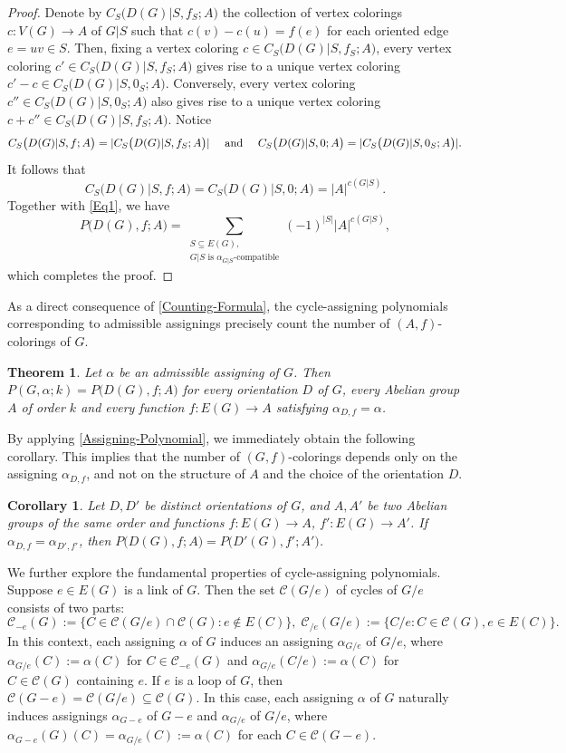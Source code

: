 \documentclass[12pt]{article}%
\numberwithin{equation}{section}
\def\And{\mbox{\rm ~and~}}
\newtheorem{theorem}{Theorem}[section]
\newtheorem{corollary}[corollary]{Corollary}
\begin{document}
\begin{proof}
Denote by  $C_S\big(D(G)|S,f_S;A\big)$ the collection of  vertex colorings $c:V(G)\to A$ of $G|S$ such that $c(v)-c(u)=f(e)$ for each oriented edge $e=uv\in S$. Then, fixing a vertex coloring $c\in C_S\big(D(G)|S,f_S;A\big)$, every vertex coloring $c'\in C_S\big(D(G)|S,f_S;A\big)$ gives rise to a unique vertex coloring $c'-c\in C_S\big(D(G)|S,0_S;A\big)$. Conversely, every vertex coloring $c''\in C_S\big(D(G)|S,0_S;A\big)$ also gives rise to a unique vertex coloring $c+c''\in C_S\big(D(G)|S,f_S;A\big)$. Notice
\[
C_S\big(D(G)|S,f;A\big)=|C_S\big(D(G)|S,f_S;A\big)|\quad\And\quad C_S\big(D(G)|S,0;A\big)=|C_S\big(D(G)|S,0_S;A\big)|.
\]
It follows that
\begin{equation*}
C_S\big(D(G)|S,f;A\big)=C_S\big(D(G)|S,0;A\big)=|A|^{c(G|S)}.
\end{equation*}
Together with \eqref{Eq1}, we have
\[
P\big(D(G),f;A\big)=\sum_{\substack{S\subseteq E(G),\\G|S\mbox{ is $\alpha_{G|S}$-compatible}}}(-1)^{|S|}|A|^{c(G|S)},
\]
which completes the proof.
\end{proof}
As a direct consequence of \autoref{Counting-Formula}, the cycle-assigning polynomials corresponding to admissible assignings precisely count the number of $(A,f)$-colorings of  $G$. 
\begin{theorem}\label{Assigning-Polynomial}
Let $\alpha$ be an admissible assigning of $G$. Then $P(G,\alpha;k)=P\big(D(G),f;A\big)$ for every orientation $D$ of $G$, every Abelian group $A$ of order $k$ and every function $f:E(G)\to A$ satisfying $\alpha_{D,f}=\alpha$.
\end{theorem}

By applying \autoref{Assigning-Polynomial}, we immediately obtain the following corollary. This implies that the number of $(G,f)$-colorings depends only on the assigning $\alpha_{D,f}$, and not on the structure of $A$ and the choice of the orientation $D$.
\begin{corollary}\label{A=B}
Let  $D,D'$ be distinct orientations of $G$, and $A,A'$ be two Abelian groups of the same order and functions $f:E(G)\to A$, $f':E(G)\to A'$. If $\alpha_{D,f}=\alpha_{D',f'}$, then $P\big(D(G),f;A\big)=P\big(D'(G),f';A'\big)$.
\end{corollary}

We further explore the fundamental properties of cycle-assigning polynomials. Suppose $e\in E(G)$ is a link of $G$. Then the set $\mathcal{C}(G/e)$ of cycles of $G/e$ consists of two parts: 
\[
\mathcal{C}_{-e}(G):=\big\{C\in\mathcal{C}(G/e)\cap\mathcal{C}(G):e\notin E(C)\big\},\;\mathcal{C}_{/e}(G/e):=\big\{C/e:C\in\mathcal{C}(G),e\in E(C)\big\}.
\]
In this context, each assigning $\alpha$ of $G$ induces an assigning $\alpha_{G/e}$ of $G/e$, where $\alpha_{G/e}(C):=\alpha(C)$ for $C\in \mathcal{C}_{-e}(G)$ and $\alpha_{G/e}(C/e):=\alpha(C)$ for $C\in \mathcal{C}(G)$ containing $e$. If $e$ is a loop of $G$, then $\mathcal{C}(G-e)=\mathcal{C}(G/e)\subseteq\mathcal{C}(G)$. In this case, each assigning $\alpha$ of $G$ naturally induces assignings $\alpha_{G-e}$ of $G-e$ and  $\alpha_{G/e}$ of $G/e$, where $\alpha_{G-e}(G)(C)=\alpha_{G/e}(C):=\alpha(C)$ for each $C\in\mathcal{C}(G-e)$.
\end{document}
